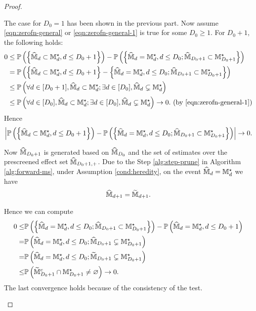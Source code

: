\documentclass[12pt]{article}
\begin{document}
\begin{proof}
\begin{enumerate}
    
    The case for $D_0=1$ has been shown in the previous part. Now assume \eqref{eqn:zerofn-general} or \eqref{eqn:zerofn-general-1} is true for some $D_0\ge1$.  For $D_0+1$, 
    the following holds:
    \begin{align*} 
        0&\le {\mathbb{P}}\left(\left\{\widehat{{\mathbb{M}}}_d\subset{\mathbb{M}}^\star_d, d\le D_0+1\right\}\right)-{\mathbb{P}}\left(\left\{\widehat{{\mathbb{M}}}_d={\mathbb{M}}^\star_d, d\le D_0; \widehat{{\mathbb{M}}}_{D_0+1}\subset{\mathbb{M}}^\star_{D_0+1}\right\}\right) \\
        &= {\mathbb{P}}\left(\left\{\widehat{{\mathbb{M}}}_d\subset{\mathbb{M}}^\star_d, d\le D_0+1\right\} - \left\{\widehat{{\mathbb{M}}}_d={\mathbb{M}}^\star_d, d\le D_0; \widehat{{\mathbb{M}}}_{D_0+1}\subset{\mathbb{M}}^\star_{D_0+1}\right\}\right)\notag\\
        &\le {\mathbb{P}}\left(\forall d\in[D_0+1], \widehat{{\mathbb{M}}}_{d}\subset{\mathbb{M}}^\star_{d}; \exists d\in[D_0], \widehat{{\mathbb{M}}}_d\subsetneq{\mathbb{M}}^\star_d\right)\notag\\
        &\le {\mathbb{P}}\left(\forall d\in[D_0], \widehat{{\mathbb{M}}}_{d}\subset{\mathbb{M}}^\star_{d};\exists d\in[D_0], \widehat{{\mathbb{M}}}_d\subsetneq{\mathbb{M}}^\star_d\right)\to 0.\text{ (by \eqref{eqn:zerofn-general-1})}
    \end{align*}
    Hence
    \begin{align}%
        \lt|\bbP\left(\left\{\hat{\bbM}_d\subset\bbM^\star_d, d\le D_0+1\right\}\right) - 
        \bbP\left(\left\{\hat{\bbM}_d=\bbM^\star_d, d\le D_0; \hat{\bbM}_{D_0+1}\subset\bbM^\star_{D_0+1}\right\}\right)\rt| \to 0.
    \end{align}
    
    Now $\widehat{{\mathbb{M}}}_{D_0+1}$ is generated based on $\widehat{{\mathbb{M}}}_{D_0}$ and the set of estimates over the prescreened effect set  $\widehat{{\mathbb{M}}}_{D_0+1,+}$. Due to the Step \ref{alg:step-prune} in Algorithm \ref{alg:forward-ms},  under Assumption \ref{cond:heredity}, on the event $\widehat{{\mathbb{M}}}_d = {\mathbb{M}}_d^\star$ we have
    \begin{align*}
        \widehat{{\mathbb{M}}}_{d+1} = \widetilde{{\mathbb{M}}}_{d+1}.
    \end{align*}
    
    Hence we can compute
    \begin{align*}
        0\le& {\mathbb{P}}\left(\left\{\widehat{{\mathbb{M}}}_d={\mathbb{M}}^\star_d, d\le D_0; \widehat{{\mathbb{M}}}_{D_0+1}\subset{\mathbb{M}}^\star_{D_0+1}\right\}\right) - {\mathbb{P}}\left(\widehat{{\mathbb{M}}}_d={\mathbb{M}}^\star_d, d\le D_0+1\right)\\
        = & {\mathbb{P}}\left(\widehat{{\mathbb{M}}}_d={\mathbb{M}}^\star_d, d\le D_0; \widehat{{\mathbb{M}}}_{D_0+1}\subsetneq {\mathbb{M}}^{\star }_{D_0+1}\right) \\
        = & {\mathbb{P}}\left(\widehat{{\mathbb{M}}}_d={\mathbb{M}}^\star_d, d\le D_0; \widetilde{{\mathbb{M}}}_{D_0+1}\subsetneq {\mathbb{M}}^{\star }_{D_0+1}\right) \\
        \le&  {\mathbb{P}}\left(\widetilde{{\mathbb{M}}}^c_{D_0+1}\cap{\mathbb{M}}^{\star }_{D_0+1}\neq\varnothing\right)\to 0.
    \end{align*}
   The last convergence holds  because of the consistency of the test.
    

\end{enumerate}
\end{proof}
\end{document}
